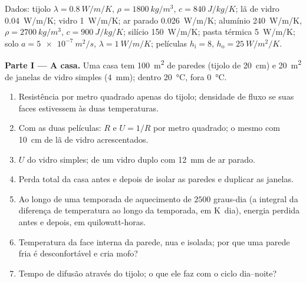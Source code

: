 \begin{problem}\label{pb:b2:heat-conduction:1}
Dados: tijolo $\lambda = \qty{0.8}{W/m/K}$, $\rho = \qty{1800}{kg/m^3}$, $c =
\qty{840}{J/kg/K}$; lã de vidro \qty{0.04}{W/m/K}; vidro \qty{1}{W/m/K}; ar
parado \qty{0.026}{W/m/K}; alumínio \qty{240}{W/m/K}, $\rho = \qty{2700}{kg/m^3}$,
$c = \qty{900}{J/kg/K}$; silício \qty{150}{W/m/K}; pasta térmica
\qty{5}{W/m/K}; solo $a = \qty{5e-7}{m^2/s}$, $\lambda = \qty{1}{W/m/K}$;
películas $h_{\text{i}} = 8$, $h_{\text{o}} = \qty{25}{W/m^2/K}$.

\textbf{Parte I --- A casa.}
Uma casa tem \qty{100}{m^2} de paredes (tijolo de \qty{20}{cm}) e \qty{20}{m^2}
de janelas de vidro simples (\qty{4}{mm}); dentro \qty{20}{\celsius},
fora \qty{0}{\celsius}.
\begin{enumerate}
  \item Resistência por metro quadrado apenas do tijolo; densidade de fluxo
        se suas faces estivessem às duas temperaturas.
  \item Com as duas películas: $R$ e $U = 1/R$ por metro quadrado; o mesmo
        com \qty{10}{cm} de lã de vidro acrescentados.
  \item $U$ do vidro simples; de um vidro duplo com \qty{12}{mm}
        de ar parado.
  \item Perda total da casa antes e depois de isolar as paredes
        e duplicar as janelas.
  \item Ao longo de uma temporada de aquecimento de $2500$ graus-dia (a integral da
        diferença de temperatura ao longo da temporada, em \unit{K.dia}),
        energia perdida antes e depois, em quilowatt-horas.
  \item Temperatura da face interna da parede, nua e isolada;
        por que uma parede fria é desconfortável e cria mofo?
  \item Tempo de difusão através do tijolo; o que ele faz com o
        ciclo dia--noite?
\end{enumerate}


\end{problem}
